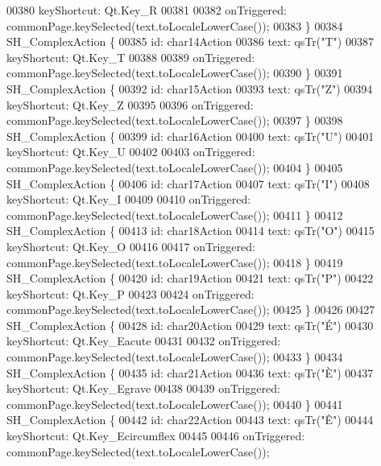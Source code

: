 \begin{DoxyCode}
00380         keyShortcut: Qt.Key\_R
00381 
00382         onTriggered: commonPage.keySelected(text.toLocaleLowerCase());
00383     \}
00384     SH\_ComplexAction \{
00385         \textcolor{keywordtype}{id}: char14Action
00386         text: qsTr(\textcolor{stringliteral}{"T"})
00387         keyShortcut: Qt.Key\_T
00388 
00389         onTriggered: commonPage.keySelected(text.toLocaleLowerCase());
00390     \}
00391     SH\_ComplexAction \{
00392         \textcolor{keywordtype}{id}: char15Action
00393         text: qsTr(\textcolor{stringliteral}{"Z"})
00394         keyShortcut: Qt.Key\_Z
00395 
00396         onTriggered: commonPage.keySelected(text.toLocaleLowerCase());
00397     \}
00398     SH\_ComplexAction \{
00399         \textcolor{keywordtype}{id}: char16Action
00400         text: qsTr(\textcolor{stringliteral}{"U"})
00401         keyShortcut: Qt.Key\_U
00402 
00403         onTriggered: commonPage.keySelected(text.toLocaleLowerCase());
00404     \}
00405     SH\_ComplexAction \{
00406         \textcolor{keywordtype}{id}: char17Action
00407         text: qsTr(\textcolor{stringliteral}{"I"})
00408         keyShortcut: Qt.Key\_I
00409 
00410         onTriggered: commonPage.keySelected(text.toLocaleLowerCase());
00411     \}
00412     SH\_ComplexAction \{
00413         \textcolor{keywordtype}{id}: char18Action
00414         text: qsTr(\textcolor{stringliteral}{"O"})
00415         keyShortcut: Qt.Key\_O
00416 
00417         onTriggered: commonPage.keySelected(text.toLocaleLowerCase());
00418     \}
00419     SH\_ComplexAction \{
00420         \textcolor{keywordtype}{id}: char19Action
00421         text: qsTr(\textcolor{stringliteral}{"P"})
00422         keyShortcut: Qt.Key\_P
00423 
00424         onTriggered: commonPage.keySelected(text.toLocaleLowerCase());
00425     \}
00426 
00427     SH\_ComplexAction \{
00428         \textcolor{keywordtype}{id}: char20Action
00429         text: qsTr(\textcolor{stringliteral}{"É"})
00430         keyShortcut: Qt.Key\_Eacute
00431 
00432         onTriggered: commonPage.keySelected(text.toLocaleLowerCase());
00433     \}
00434     SH\_ComplexAction \{
00435         \textcolor{keywordtype}{id}: char21Action
00436         text: qsTr(\textcolor{stringliteral}{"È"})
00437         keyShortcut: Qt.Key\_Egrave
00438 
00439         onTriggered: commonPage.keySelected(text.toLocaleLowerCase());
00440     \}
00441     SH\_ComplexAction \{
00442         \textcolor{keywordtype}{id}: char22Action
00443         text: qsTr(\textcolor{stringliteral}{"Ê"})
00444         keyShortcut: Qt.Key\_Ecircumflex
00445 
00446         onTriggered: commonPage.keySelected(text.toLocaleLowerCase());

\end{DoxyCode}
